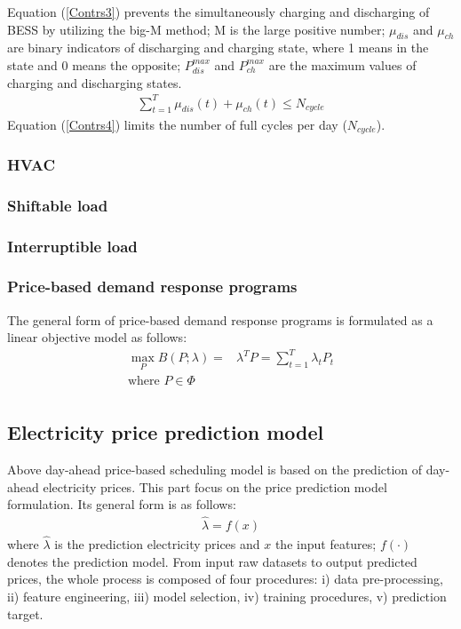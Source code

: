 \documentclass[journal]{IEEEtran}
\begin{document}
Equation (\ref{Contrs3}) prevents the simultaneously charging and discharging of BESS by utilizing the big-M method; M is the large positive number; $\mu_{dis}$ and $\mu_{ch}$ are binary indicators of discharging and charging state, where 1 means in the state and 0 means the opposite; $P_{dis}^{max}$ and $P_{ch}^{max}$ are the maximum values of charging and discharging states.
\begin{equation}
  \label{Contrs4}
  \begin{aligned}
    \sum_{t=1}^T \mu_{dis}(t) + \mu_{ch}(t) \leq N_{cycle}
  \end{aligned}
\end{equation}
Equation (\ref{Contrs4}) limits the number of full cycles per day ($N_{cycle}$).


\subsubsection{HVAC}

\subsubsection{Shiftable load}

\subsubsection{Interruptible load}

\subsubsection{Price-based demand response programs}
The general form of price-based demand response programs is formulated as a linear objective model as follows:
\begin{equation}
  \label{PriceDR}
  \begin{aligned}
    \max_{P} B(P; \lambda) = &\lambda^T P = \sum_{t=1}^T \lambda_t P_t \\
    \text{where }  P \in \Phi \\
  \end{aligned}
\end{equation}

\subsection{Electricity price prediction model}
Above day-ahead price-based scheduling model is based on the prediction of day-ahead electricity prices. This part focus on the price prediction model formulation. Its general form is as follows:
\begin{equation}
  \label{Prediction}
  \begin{aligned}
    \hat{\lambda} = f(x)
  \end{aligned}
\end{equation}
where $\hat{\lambda}$ is the prediction electricity prices and $x$ the input features; $f(\cdot)$ denotes the prediction model. From input raw datasets to output predicted prices, the whole process is composed of four procedures: i) data pre-processing, ii) feature engineering, iii) model selection, iv) training procedures, v) prediction target.
\end{document}
